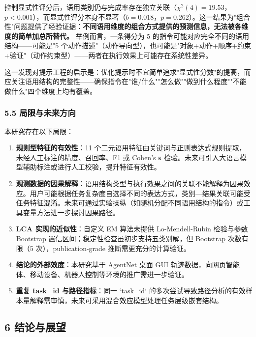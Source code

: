 \documentclass[12pt,a4paper,openany,oneside]{ctexrep}
\begin{document}
控制显式性评分后，语用类别仍与完成率存在独立关联（$\chi^2(4)=19.53$，$p<0.001$），而显式性评分本身不显著（$b=0.018$，$p=0.262$）。这一结果为"组合性"问题提供了经验证据：\textbf{不同语用维度的组合方式提供的预测信息，无法被各维度的简单加总所替代。} 举例而言，一条得分为 5 的指令可能对应完全不同的语用结构——可能是"5 个动作描述"（动作导向型），也可能是"对象+动作+顺序+约束+验证"（动作约束型）——两者在执行效果上可能存在系统性差异。

这一发现对提示工程的启示是：优化提示时不宜简单追求"显式性分数"的提高，而应关注语用结构的完整性——确保指令在"谁/什么""怎么做""做到什么程度""不能做什么"四个维度上均有覆盖。

\subsubsection{5.5 局限与未来方向}


本研究存在以下局限：

\begin{enumerate}
\item[1.] \textbf{规则型特征的有效性}：11 个二元语用特征由关键词与正则表达式规则提取，未经人工标注的精度、召回率、F1 或 Cohen's κ 检验。未来可引入大语言模型辅助标注或进行人工校验，提升特征有效性。

\item[2.] \textbf{观测数据的因果解释}：语用结构类型与执行效果之间的关联不能解释为因果效应。用户可能根据任务复杂度自选择不同的表达方式，类别—结果关联可能受任务特征混淆。未来可通过实验操纵（如随机分配不同语用结构的指令）或工具变量方法进一步探讨因果路径。

\item[3.] \textbf{LCA 实现的近似性}：自定义 EM 算法未提供 Lo-Mendell-Rubin 检验与参数 Bootstrap 置信区间；稳定性检查虽初步支持五类别解，但 Bootstrap 次数有限（5 次），publication-grade 推断需更充分的计算验证。

\item[4.] \textbf{结论的外部效度}：本研究基于 AgentNet 桌面 GUI 轨迹数据，向网页智能体、移动设备、机器人控制等环境的推广需进一步验证。

\item[5.] \textbf{重复 task\_id 与路径指标}：同一 `task\_id` 的多次尝试导致路径分析的有效样本量解释需审慎，未来可采用混合效应模型处理任务层级嵌套结构。
\end{enumerate}


\subsection{6 结论与展望}
\end{document}
